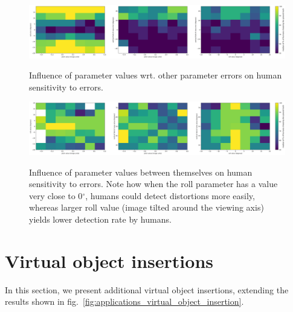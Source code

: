 \begin{figure}[!ht]
\centering
\includegraphics[width=\linewidth]{study_results/hist2d_image_units_value_error.png}\\
\caption[Influence of parameter values wrt. other parameter errors on
human sensitivity]{Influence of parameter values wrt. other parameter errors on
human sensitivity to errors.}
\end{figure}

\begin{figure}[!ht]
\centering
\includegraphics[width=\linewidth]{study_results/hist2d_image_units_value_value.png}\\
\caption[Influence of parameter values between themselves on human sensitivity]{Influence of parameter values between themselves on human
sensitivity to errors. Note how when the roll parameter has a value very
close to 0$^\circ$, humans could detect distortions more easily, whereas larger
roll value (image tilted around the viewing axis) yields lower detection
rate by humans.}
\end{figure}

\FloatBarrier

\protect\hypertarget{voi}{}{}

\hypertarget{virtual-object-insertions}{%
\section{Virtual object insertions}\label{virtual-object-insertions}}

In this section, we present additional virtual object insertions,
extending the results shown in fig.~\ref{fig:applications_virtual_object_insertion}.



